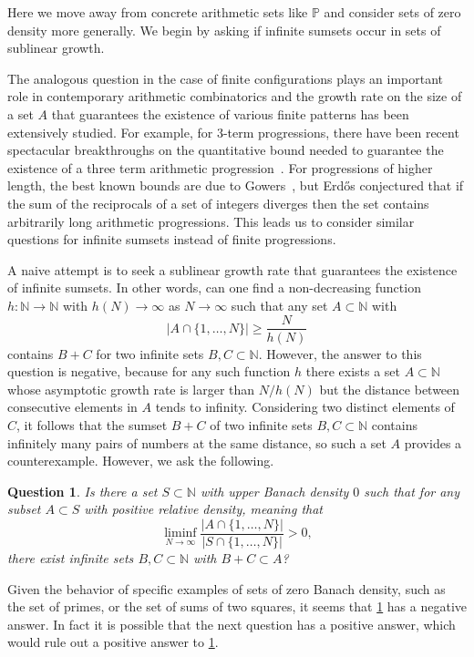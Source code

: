 \documentclass[10pt,dvipsnames]{article}
\newtheorem{question}[theorem]{Question}
\theoremstyle{definition}
\theoremstyle{plain}
\renewcommand{\P}{\mathbb{P}}
\newcommand{\N}{\mathbb{N}}
\newcommand{\Erdos}{Erd\H{o}s}
\begin{document}
Here we move away from concrete arithmetic sets like $\P$ and consider sets of zero density more generally. 
We begin by asking if infinite sumsets occur in sets of sublinear growth.

The analogous question in the case of finite configurations plays an important role in contemporary arithmetic combinatorics and the growth rate on the size of a set $A$ that guarantees the existence of various finite patterns has been extensively studied.
For example, for $3$-term progressions, there have been recent spectacular breakthroughs on the quantitative bound needed to guarantee the existence of a three term arithmetic progression~\cite{Bloom-Sisak, Kelley-Meka}.
For progressions of higher length, the best known bounds are due to Gowers~\cite{Gowers01}, but \Erdos{} conjectured that if the sum of the reciprocals of a set of integers diverges then the set contains arbitrarily long arithmetic progressions.  
This leads us to consider similar questions for infinite sumsets instead of finite progressions. 


A naive attempt is to seek a sublinear growth rate that guarantees the existence of infinite sumsets. 
In other words, can one find a non-decreasing function $h\colon\N\to\N$ with $h(N)\to\infty$ as $N\to\infty$ such that any set $A\subset \N$ with
\begin{equation}
    \label{eq:growth-rate}
|A\cap \{1,\ldots,N\}|\geq \frac{N}{h(N)}
\end{equation}
contains $B+C$ for two infinite sets $B,C\subset\N$. 
However, the answer to this question is negative, because for any such function $h$ there exists a set $A\subset \N$ whose asymptotic growth rate is larger than $N/h(N)$ but the distance between consecutive elements in $A$ tends to infinity. 
Considering two distinct elements of $C$, it follows that the sumset $B+C$ of two infinite sets $B,C\subset\N$ contains infinitely many pairs of numbers at the same distance, so such a set $A$ provides a counterexample.  
However, we ask the following.

\begin{question}\label{q_sos_4}
    Is there a set $S\subset\N$ with upper Banach density $0$ such that for any subset $A\subset S$ with positive relative density, meaning that 
    \[
    \liminf_{N\to\infty}\frac{|A\cap\{1,\ldots,N\}|}{|S\cap\{1,\ldots,N\}|}>0, 
    \]
    there exist infinite sets $B,C\subset\N$ with $B+C\subset A$?
\end{question}

Given the behavior of specific examples of sets of zero Banach density, such as the set of primes, or the set of sums of two squares, it seems that \cref{q_sos_4} has a negative answer. 
In fact it is possible that the next question has a positive answer, which would rule out a positive answer to \cref{q_sos_4}.
\end{document}
